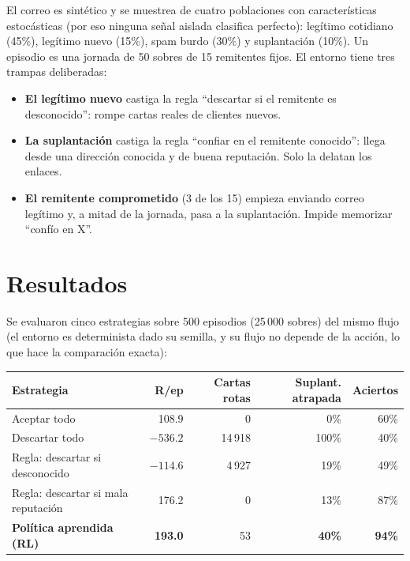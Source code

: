 \documentclass[11pt]{article}
\begin{document}
El correo es sintético y se muestrea de cuatro poblaciones con
características estocásticas (por eso ninguna señal aislada clasifica
perfecto): legítimo cotidiano (45\%), legítimo nuevo (15\%), spam burdo
(30\%) y suplantación (10\%). Un episodio es una jornada de 50 sobres de 15
remitentes fijos. El entorno tiene tres trampas deliberadas:

\begin{itemize}[leftmargin=1.4em]
  \item \textbf{El legítimo nuevo} castiga la regla ``descartar si el
    remitente es desconocido'': rompe cartas reales de clientes nuevos.
  \item \textbf{La suplantación} castiga la regla ``confiar en el remitente
    conocido'': llega desde una dirección conocida y de buena reputación.
    Solo la delatan los enlaces.
  \item \textbf{El remitente comprometido} (3 de los 15) empieza enviando
    correo legítimo y, a mitad de la jornada, pasa a la suplantación. Impide
    memorizar ``confío en X''.
\end{itemize}

\section{Resultados}

Se evaluaron cinco estrategias sobre 500 episodios (25\,000 sobres) del
mismo flujo (el entorno es determinista dado su semilla, y su flujo no
depende de la acción, lo que hace la comparación exacta):

\begin{center}
\begin{tabular}{@{}lrrrr@{}}
\toprule
\textbf{Estrategia} & \textbf{R/ep} & \textbf{Cartas rotas} & \textbf{Suplant. atrapada} & \textbf{Aciertos} \\
\midrule
Aceptar todo & 108.9 & 0 & 0\% & 60\% \\
Descartar todo & $-536.2$ & 14\,918 & 100\% & 40\% \\
Regla: descartar si desconocido & $-114.6$ & 4\,927 & 19\% & 49\% \\
Regla: descartar si mala reputación & 176.2 & 0 & 13\% & 87\% \\
\textbf{Política aprendida (RL)} & \textbf{193.0} & 53 & \textbf{40\%} & \textbf{94\%} \\
\bottomrule
\end{tabular}
\end{center}
\end{document}
